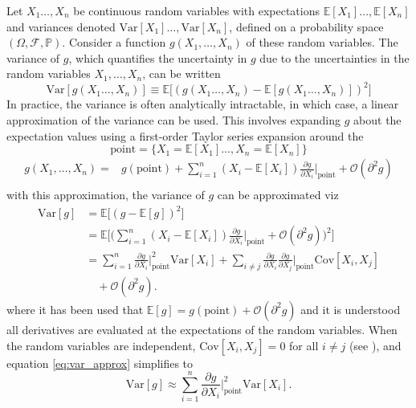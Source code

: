 \begin{definition}
	\label{def:error_propagation}
	Let $X_1 \ldots, X_n$ be continuous random variables with expectations $\mathbb{E}[X_1] \ldots, \mathbb{E}[X_n]$ and variances denoted $\text{Var}[X_1] \ldots, \text{Var}[X_n]$, defined on a probability space $(\Omega, \mathcal{F},\mathbb{P})$. Consider a function $g(X_1, \ldots, X_n)$ of these random variables. The variance of $g$, which quantifies the uncertainty in $g$ due to the uncertainties in the random variables $X_1, \ldots, X_n$, can be written
	\begin{equation}
			\text{Var}[g(X_1 \ldots, X_n)] \equiv \mathbb{E}\big[(g(X_1 \ldots, X_n) - \mathbb{E}[g(X_1 \ldots, X_n)])^2\big] 
	\end{equation}
	In practice, the variance is often analytically intractable, in which case, a linear approximation of the variance can be used. This involves expanding $g$ about the expectation values using a first-order Taylor series expansion around the 
	\begin{equation}
		 \text{point}=\{X_1 = \mathbb{E}[X_1] \ldots, X_n = \mathbb{E}[X_n]\}
	\end{equation}
	\begin{equation}
		\begin{split}
			g(X_1, \ldots, X_n) =& g(\text{point}) + \sum_{i=1}^n (X_i - \mathbb{E}[X_i]) \frac{\partial g}{\partial X_i} \bigg|_{\text{point}} + \mathcal{O}(\partial^2 g) \\
		\end{split}
		\label{e1}
	\end{equation}
	with this approximation, the variance of $g$ can be approximated viz
	\begin{equation}
		\begin{split}
			\text{Var}[g] &= \mathbb{E}\big[(g - \mathbb{E}[g])^2\big] \\
			&= \mathbb{E}\bigg[\bigg( \sum_{i=1}^n (X_i - \mathbb{E}[X_i]) \frac{\partial g}{\partial X_i}\bigg|_{\text{point}} + \mathcal{O}(\partial^2 g)\bigg)^2\bigg] \\
			&= \sum_{i=1}^n  \frac{\partial g}{\partial X_i}\bigg|_{\text{point}}^2\text{Var}[X_i] + \sum_{i \neq j} \frac{\partial g}{\partial X_i} \frac{\partial g}{\partial X_j}\bigg|_{\text{point}} \text{Cov}[X_i, X_j]\\
			&\quad + \mathcal{O}(\partial^2 g).
		\end{split}
	\label{eq:var_approx}
	\end{equation}
	where it has been used that $\mathbb{E}[g]=g(\text{point})+\mathcal{O}(\partial^2g)$ and it is understood all derivatives are evaluated at the expectations of the random variables. When the random variables are independent, $\text{Cov}[X_i, X_j] = 0$ for all $i \neq j$ (see ), and equation \eqref{eq:var_approx} simplifies to
	\begin{equation}
		\text{Var}[g] \approx \sum_{i=1}^n  \frac{\partial g}{\partial X_i}\bigg|_{\text{point}}^2\text{Var}[X_i].
	\end{equation}
\end{definition}

